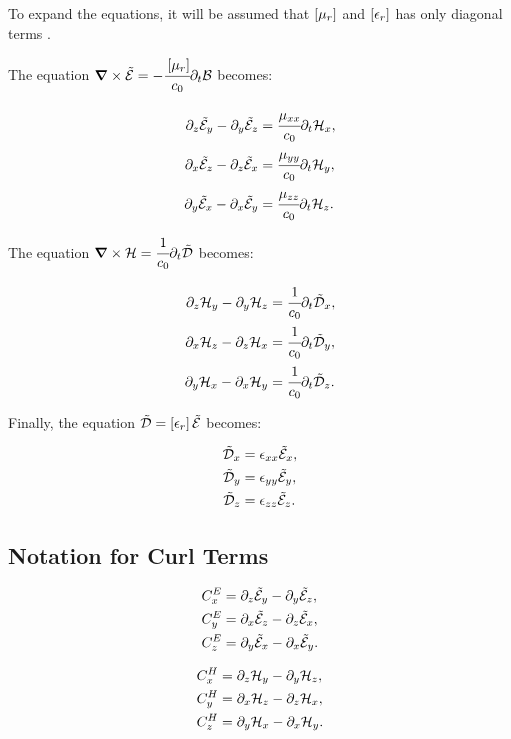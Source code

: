To expand the equations, it will be assumed that $\brackets{\mu_r}$ and $\brackets{\epsilon_r}$ has only diagonal terms \cite{rumpf_book}. 

The equation $\rot \En = - \cfrac{\brackets{\mu_r}}{c_0} \partial _t \Bt$ becomes:

\begin{align}
    \partial_z\tilde{\mathcal{E}}_y - \partial_y\tilde{\mathcal{E}}_z &= \cfrac{\mu_{xx}}{c_0} \partial_t \mathcal{H}_x, \\
    \partial_x\tilde{\mathcal{E}}_z - \partial_z\tilde{\mathcal{E}}_x &= \cfrac{\mu_{yy}}{c_0} \partial_t \mathcal{H}_y,\\
    \partial_y\tilde{\mathcal{E}}_x - \partial_x\tilde{\mathcal{E}}_y &= \cfrac{\mu_{zz}}{c_0} \partial_t \mathcal{H}_z.
\end{align}

The equation $\bm{\nabla}\times \mathcal{H} = \cfrac{1}{c_0} \partial _t \tilde{\mathcal{D}}$ becomes:

\begin{align}
    \partial_z\mathcal{H}_y - \partial_y\mathcal{H}_z &= \cfrac{1}{c_0} \partial_t \tilde{\mathcal{D}}_x, \\
    \partial_x\mathcal{H}_z - \partial_z\mathcal{H}_x &= \cfrac{1}{c_0} \partial_t \tilde{\mathcal{D}}_y, \\
    \partial_y\mathcal{H}_x - \partial_x\mathcal{H}_y &= \cfrac{1}{c_0} \partial_t \tilde{\mathcal{D}}_z.
\end{align}

Finally, the equation $ \Dn = \brackets{\epsilon_r} \En $ becomes:

\begin{align}
    \tilde{\mathcal{D}}_x &= \epsilon_{xx} \tilde{\mathcal{E}}_x, \label{eq:Dn_x}\\
    \tilde{\mathcal{D}}_y &= \epsilon_{yy} \tilde{\mathcal{E}}_y, \label{eq:Dn_y}\\
    \tilde{\mathcal{D}}_z &= \epsilon_{zz} \tilde{\mathcal{E}}_z. \label{eq:Dn_z}
\end{align}

\subsection{Notation for Curl Terms}

\begin{align}
    C_x^E &= \partial_z\tilde{\mathcal{E}}_y - \partial_y\tilde{\mathcal{E}}_z, \\
    C_y^E &= \partial_x\tilde{\mathcal{E}}_z - \partial_z\tilde{\mathcal{E}}_x, \\
    C_z^E &= \partial_y\tilde{\mathcal{E}}_x - \partial_x\tilde{\mathcal{E}}_y.
\end{align}

\begin{align}
    C_x^H &= \partial_z\mathcal{H}_y - \partial_y\mathcal{H}_z, \\
    C_y^H &= \partial_x\mathcal{H}_z - \partial_z\mathcal{H}_x, \\
    C_z^H &= \partial_y\mathcal{H}_x - \partial_x\mathcal{H}_y.
\end{align}

